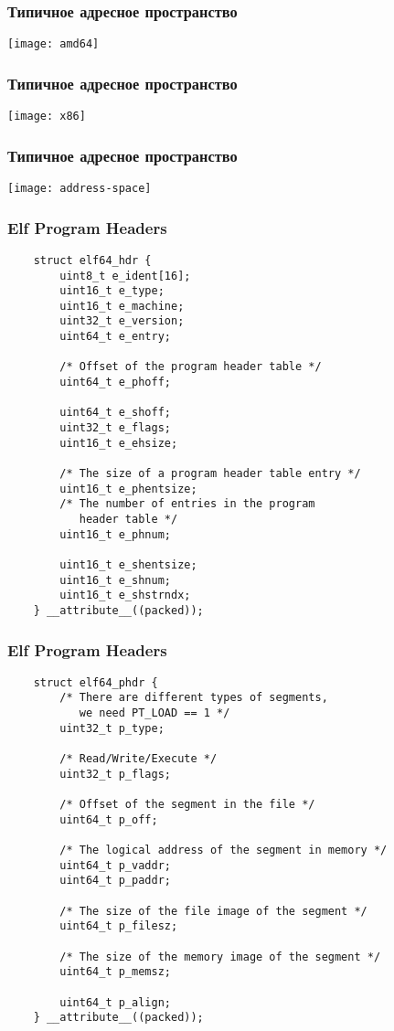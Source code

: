 \begin{frame}
\frametitle{Типичное адресное пространство}
\texttt{[image: amd64]}
\end{frame}

\begin{frame}
\frametitle{Типичное адресное пространство}
\texttt{[image: x86]}
\end{frame}

\begin{frame}
\frametitle{Типичное адресное пространство}
\texttt{[image: address-space]}
\end{frame}


\begin{frame}[fragile]
\frametitle{Elf Program Headers}
\begin{lstlisting}
    struct elf64_hdr {
        uint8_t e_ident[16];
        uint16_t e_type;
        uint16_t e_machine;
        uint32_t e_version;
        uint64_t e_entry;

        /* Offset of the program header table */
        uint64_t e_phoff;

        uint64_t e_shoff;
        uint32_t e_flags;
        uint16_t e_ehsize;

        /* The size of a program header table entry */
        uint16_t e_phentsize;
        /* The number of entries in the program
           header table */
        uint16_t e_phnum;

        uint16_t e_shentsize;
        uint16_t e_shnum;
        uint16_t e_shstrndx;
    } __attribute__((packed));
\end{lstlisting}
\end{frame}

\begin{frame}[fragile]
\frametitle{Elf Program Headers}
\begin{lstlisting}
    struct elf64_phdr {
        /* There are different types of segments,
           we need PT_LOAD == 1 */
        uint32_t p_type;

        /* Read/Write/Execute */
        uint32_t p_flags;

        /* Offset of the segment in the file */
        uint64_t p_off;

        /* The logical address of the segment in memory */
        uint64_t p_vaddr;
        uint64_t p_paddr;

        /* The size of the file image of the segment */
        uint64_t p_filesz;

        /* The size of the memory image of the segment */
        uint64_t p_memsz;

        uint64_t p_align;
    } __attribute__((packed));
\end{lstlisting}
\end{frame}

